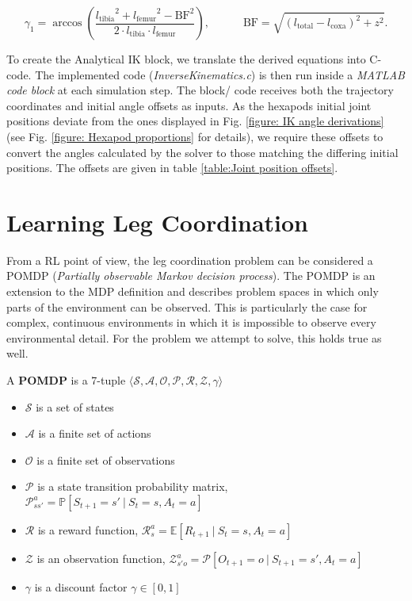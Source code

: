 \[
	\gamma_1 = \arccos(\frac{{l_\text{tibia}}^2 + {l_\text{femur}}^2 - {\text{BF}}^2}  {2 \cdot {l_\text{tibia}} \cdot {l_\text{femur}}}) ,\quad \quad \quad \text{BF} = \sqrt{(l_\text{total} - l_\text{coxa})^2 + z^2}.
\]

To create the Analytical IK block, we translate the derived equations into C-code.
The implemented code (\textit{InverseKinematics.c}) is then run inside a \textit{MATLAB code block} at each simulation step.
The block/ code receives both the trajectory coordinates and initial angle offsets as inputs.
As the hexapods initial joint positions deviate from the ones displayed in Fig. \ref{figure: IK angle derivations} (see Fig. \ref{figure: Hexapod proportions} for details), we require these offsets to convert the angles calculated by the solver to  those matching the differing initial positions.
The offsets are given in table \ref{table:Joint position offsets}.


\section{Learning Leg Coordination} \label{sec: RL setup}
From a RL point of view, the leg coordination problem can be considered a POMDP (\emph{Partially observable Markov decision process}).
The POMDP is an extension to the MDP definition and describes problem spaces in which only parts of the environment can be observed.
This is particularly the case for complex, continuous environments in which it is impossible to observe every environmental detail.
For the problem we attempt to solve, this holds true as well.

\begin{definition}
	A \textbf{POMDP} is a 7-tuple $\langle \mathcal{S,A,O,P,R,Z,\gamma} \rangle$
	\begin{itemize}
		\item $\mathcal{S}$ is a set of states
		\item $\mathcal{A}$ is a finite set of actions
		\item $\mathcal{O}$ is a finite set of observations
		\item $\mathcal{P}$ is a state transition probability matrix, $\mathcal{P}_{ss'}^a = \mathbb{P}[S_{t+1} = s' \ | \ S_t = s, A_t = a	] $
		\item $\mathcal{R}$ is a reward function, $\mathcal{R}_s^a = \mathbb{E}[R_{t+1} \ | \ S_t = s, A_t = a]$
		\item $\mathcal{Z}$ is an observation function, $\mathcal{Z}_{s'o}^a = \mathcal{P}[O_{t+1} = o \ | \ S_{t+1} = s', A_t = a]$
		\item $\mathcal{\gamma}$ is a discount factor $\mathcal{\gamma} \in [0,1]$
	\end{itemize}
\end{definition}

